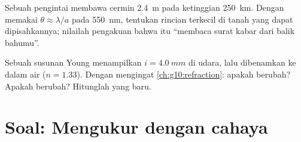 \begin{exercise}[$\star\star\star$]\label{exo:g12:light-as-wave:14}
Sebuah  pengintai membawa cermin \qty{2.4}{m} pada ketinggian
\qty{250}{km}. Dengan memakai $\theta \approx \lambda/a$ pada
\qty{550}{nm}, tentukan rincian terkecil di tanah yang dapat
dipisahkannya; nilailah pengakuan bahwa  itu ``membaca surat
kabar dari balik bahumu''.
\end{exercise}

\begin{exercise}[$\star\star\star$]\label{exo:g12:light-as-wave:15}
Sebuah susunan Young menampilkan $i = \qty{4.0}{mm}$ di udara, lalu
dibenamkan ke dalam air ($n = 1.33$). Dengan mengingat
\cref{ch:g10:refraction}: apakah  berubah? Apakah  berubah? Hitunglah  yang baru.
\end{exercise}

\section{Soal: Mengukur dengan cahaya}

